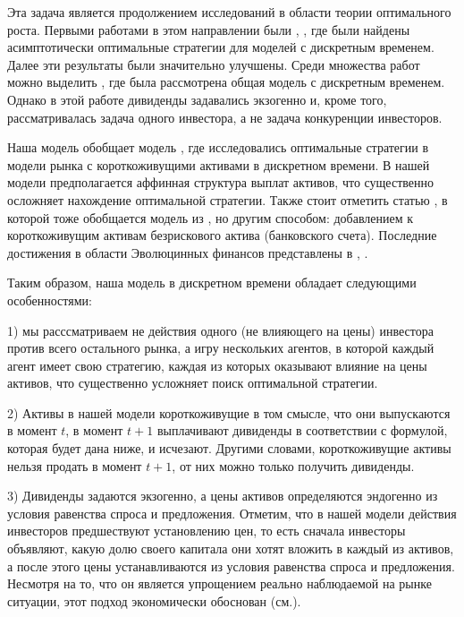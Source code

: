 \documentclass[a4paper,12pt,russian]{article} %
\theoremstyle{definition}
\begin{document}
Эта задача является продолжением исследований в области теории оптимального роста. Первыми работами в этом направлении были \cite{Kelly1956}, \cite{Breiman1961}, где были найдены асимптотически оптимальные стратегии для моделей с дискретным временем. Далее эти результаты были значительно улучшены. Среди множества работ можно выделить \cite{AlgoetCover1988}, где была рассмотрена общая модель с дискретным временем. Однако в этой работе дивиденды задавались экзогенно и, кроме того, рассматривалась задача одного инвестора, а не задача конкуренции инвесторов.

Наша модель обобщает модель \cite{Amir2013}, где исследовались оптимальные стратегии в модели рынка с короткоживущими активами в дискретном времени. В нашей модели предполагается аффинная структура выплат активов, что существенно осложняет нахождение оптимальной стратегии. Также стоит отметить статью \cite{Drokin-Zhitlukhin2020}, в которой тоже обобщается модель из \cite{Amir2013}, но другим способом: добавлением к короткоживущим активам безрискового актива (банковского счета). Последние достижения в области Эволюцинных финансов представлены в \cite{EvstigneevEvolFinance2016}, \cite{Holfort2019}.

Таким образом, наша модель в дискретном времени обладает следующими особенностями: 

1) мы расссматриваем не  действия одного (не влияющего на цены) инвестора против всего остального рынка, а игру нескольких агентов, в которой каждый агент имеет свою стратегию, каждая из которых оказывают влияние на цены активов, что существенно усложняет 
поиск оптимальной стратегии.

2) Активы в нашей модели короткоживущие в том смысле, что они 
выпускаются в момент $t$, в момент $t+1$ выплачивают дивиденды в соответствии с формулой, которая будет дана ниже, и исчезают. Другими словами, короткоживущие активы нельзя продать 
в момент $t+1$, от них можно только получить дивиденды.

3) Дивиденды задаются экзогенно, а цены активов определяются эндогенно из условия равенства спроса и предложения. Отметим, что в нашей модели действия инвесторов предшествуют установлению цен, то есть сначала инвесторы объявляют, какую долю своего капитала они хотят вложить в каждый из активов, а после этого цены устанавливаются из условия равенства спроса и предложения. Несмотря на то, что он является упрощением реально наблюдаемой на рынке ситуации, этот подход экономически обоснован (см.\cite{Shapley-Shubik1977}).
\end{document}
